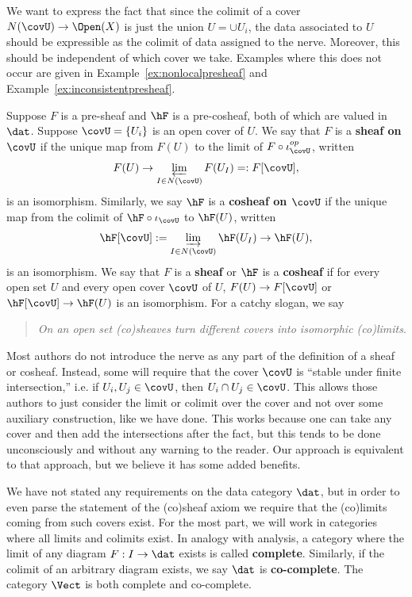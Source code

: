 We want to express the fact that since the colimit of a cover $N(\covU)\to \Open(X)$ is just the union $U=\cup U_i$, the data associated to $U$ should be expressible as the colimit of data assigned to the nerve. Moreover, this should be independent of which cover we take. Examples where this does not occur are given in Example~\ref{ex:nonlocalpresheaf} and Example~\ref{ex:inconsistentpresheaf}.
\begin{defn}\label{defn:sheaf}
	Suppose $F$ is a pre-sheaf and $\hF$ is a pre-cosheaf, both of which are valued in $\dat$. Suppose $\covU=\{U_i\}$ is an open cover of $U$. We say that $F$ is a \textbf{sheaf on $\covU$} if the unique map from $F(U)$ to the limit of $F\circ \iota^{op}_{\covU}$, written 
	\[
	F(U)\to \varprojlim_{I\in N(\covU)} F(U_I)=:F[\covU],
	\]
	is an isomorphism. Similarly, we say $\hF$ is a \textbf{cosheaf on $\covU$} if the unique map from the colimit of $\hF\circ\iota_{\covU}$ to $\hF(U)$, written
	\[
	\hF[\covU]:=\varinjlim_{I\in N(\covU)} \hF(U_I) \to \hF(U),
	\]
	is an isomorphism. We say that $F$ is a \textbf{sheaf} or $\hF$ is a \textbf{cosheaf} if for every open set $U$ and every open cover $\covU$ of $U$, $F(U)\to F[\covU]$ or $\hF[\covU]\to \hF(U)$ is an isomorphism. For a catchy slogan, we say 
\begin{quote}
	\begin{center}
	\emph{On an open set (co)sheaves turn different covers into isomorphic (co)limits}.
\end{center}
\end{quote}
\end{defn}
\begin{rmk}
	Most authors do not introduce the nerve as any part of the definition of a sheaf or cosheaf. Instead, some will require that the cover $\covU$ is ``stable under finite intersection,'' i.e. if $U_i,U_j\in\covU$, then $U_i\cap U_j\in\covU$. This allows those authors to just consider the limit or colimit over the cover and not over some auxiliary construction, like we have done. This works because one can take any cover and then add the intersections after the fact, but this tends to be done unconsciously and without any warning to the reader. Our approach is equivalent to that approach, but we believe it has some added benefits.
\end{rmk}

We have not stated any requirements on the data category $\dat$, but in order to even parse the statement of the (co)sheaf axiom we require that the (co)limits coming from such covers exist. For the most part, we will work in categories where all limits and colimits exist. In analogy with analysis, a category where the limit of any diagram $F:I\to\dat$ exists is called \textbf{complete}. Similarly, if the colimit of an arbitrary diagram exists, we say $\dat$ is \textbf{co-complete}. The category $\Vect$ is both complete and co-complete.
	
